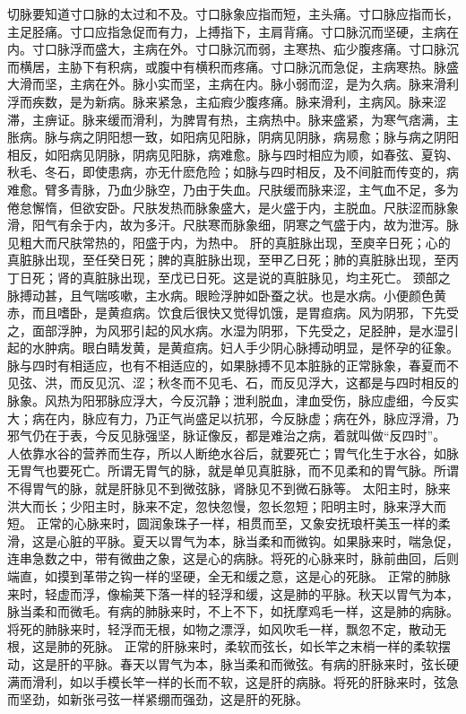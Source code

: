 \documentclass[a4paper,12pt,UTF8,twoside]{ctexbook}
\begin{document}
切脉要知道寸口脉的太过和不及。寸口脉象应指而短，主头痛。寸口脉应指而长，主足胫痛。寸口应指急促而有力，上搏指下，主肩背痛。寸口脉沉而坚硬，主病在内。寸口脉浮而盛大，主病在外。寸口脉沉而弱，主寒热、疝少腹疼痛。寸口脉沉而横居，主胁下有积病，或腹中有横积而疼痛。寸口脉沉而急促，主病寒热。脉盛大滑而坚，主病在外。脉小实而坚，主病在内。脉小弱而涩，是为久病。脉来滑利浮而疾数，是为新病。脉来紧急，主疝瘕少腹疼痛。脉来滑利，主病风。脉来涩滞，主痹证。脉来缓而滑利，为脾胃有热，主病热中。脉来盛紧，为寒气痞满，主胀病。脉与病之阴阳想一致，如阳病见阳脉，阴病见阴脉，病易愈；脉与病之阴阳相反，如阳病见阴脉，阴病见阳脉，病难愈。脉与四时相应为顺，如春弦、夏钩、秋毛、冬石，即使患病，亦无什麽危险；如脉与四时相反，及不间脏而传变的，病难愈。臂多青脉，乃血少脉空，乃由于失血。尺肤缓而脉来涩，主气血不足，多为倦怠懈惰，但欲安卧。尺肤发热而脉象盛大，是火盛于内，主脱血。尺肤涩而脉象滑，阳气有余于内，故为多汗。尺肤寒而脉象细，阴寒之气盛于内，故为泄泻。脉见粗大而尺肤常热的，阳盛于内，为热中。
肝的真脏脉出现，至庾辛日死；心的真脏脉出现，至任癸日死；脾的真脏脉出现，至甲乙日死；肺的真脏脉出现，至丙丁日死；肾的真脏脉出现，至戊已日死。这是说的真脏脉见，均主死亡。
颈部之脉搏动甚，且气喘咳嗽，主水病。眼睑浮肿如卧蚕之状。也是水病。小便颜色黄赤，而且嗜卧，是黄疸病。饮食后很快又觉得饥饿，是胃疸病。风为阴邪，下先受之，面部浮肿，为风邪引起的风水病。水湿为阴邪，下先受之，足胫肿，是水湿引起的水肿病。眼白睛发黄，是黄疸病。妇人手少阴心脉搏动明显，是怀孕的征象。
脉与四时有相适应，也有不相适应的，如果脉搏不见本脏脉的正常脉象，春夏而不见弦、洪，而反见沉、涩；秋冬而不见毛、石，而反见浮大，这都是与四时相反的脉象。风热为阳邪脉应浮大，今反沉静；泄利脱血，津血受伤，脉应虚细，今反实大；病在内，脉应有力，乃正气尚盛足以抗邪，今反脉虚；病在外，脉应浮滑，乃邪气仍在于表，今反见脉强坚，脉证像反，都是难治之病，着就叫做“反四时”。
人依靠水谷的营养而生存，所以人断绝水谷后，就要死亡；胃气化生于水谷，如脉无胃气也要死亡。所谓无胃气的脉，就是单见真脏脉，而不见柔和的胃气脉。所谓不得胃气的脉，就是肝脉见不到微弦脉，肾脉见不到微石脉等。
太阳主时，脉来洪大而长；少阳主时，脉来不定，忽快忽慢，忽长忽短；阳明主时，脉来浮大而短。
正常的心脉来时，圆润象珠子一样，相贯而至，又象安抚琅杆美玉一样的柔滑，这是心脏的平脉。夏天以胃气为本，脉当柔和而微钩。如果脉来时，喘急促，连串急数之中，带有微曲之象，这是心的病脉。将死的心脉来时，脉前曲回，后则端直，如摸到革带之钩一样的坚硬，全无和缓之意，这是心的死脉。
正常的肺脉来时，轻虚而浮，像榆荚下落一样的轻浮和缓，这是肺的平脉。秋天以胃气为本，脉当柔和而微毛。有病的肺脉来时，不上不下，如抚摩鸡毛一样，这是肺的病脉。将死的肺脉来时，轻浮而无根，如物之漂浮，如风吹毛一样，飘忽不定，散动无根，这是肺的死脉。
正常的肝脉来时，柔软而弦长，如长竿之末梢一样的柔软摆动，这是肝的平脉。春天以胃气为本，脉当柔和而微弦。有病的肝脉来时，弦长硬满而滑利，如以手模长竿一样的长而不软，这是肝的病脉。将死的肝脉来时，弦急而坚劲，如新张弓弦一样紧绷而强劲，这是肝的死脉。
\end{document}
